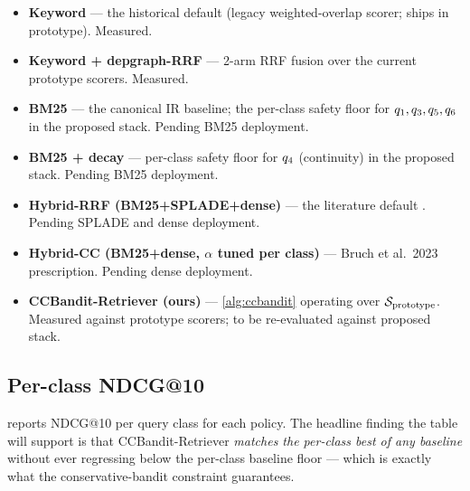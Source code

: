\begin{itemize}[leftmargin=*]
  \item \textbf{Keyword} --- the historical \blackrim default (legacy
        weighted-overlap scorer; ships in prototype). Measured.
  \item \textbf{Keyword + depgraph-RRF} --- 2-arm RRF fusion over the
        current prototype scorers. Measured.
  \item \textbf{BM25} \tothink{} --- the canonical IR baseline; the
        per-class safety floor for $q_1, q_3,
        q_5, q_6$ in the proposed stack.
        Pending BM25 deployment.
  \item \textbf{BM25 + decay} \tothink{} --- per-class safety floor for
        $q_4$ (continuity) in the proposed stack.
        Pending BM25 deployment.
  \item \textbf{Hybrid-RRF (BM25+SPLADE+dense)} \tothink{} --- the
        literature default \cite{cormack2009reciprocal}.  Pending SPLADE
        and dense deployment.
  \item \textbf{Hybrid-CC (BM25+dense, $\alpha$ tuned per class)}
        \tothink{} --- Bruch et al.\ 2023 \cite{bruch2023analysis}
        prescription.  Pending dense deployment.
  \item \textbf{CCBandit-Retriever (ours)} --- \cref{alg:ccbandit}
        operating over $\mathcal{S}_{\text{prototype}}$. Measured against
        prototype scorers; to be re-evaluated against proposed stack.
\end{itemize}

\subsection{Per-class NDCG@10}

 reports NDCG@10 per query class for each
policy. The headline finding the table will support is that
CCBandit-Retriever \emph{matches the per-class best of any baseline}
without ever regressing below the per-class baseline floor --- which is
exactly what the conservative-bandit constraint guarantees.

